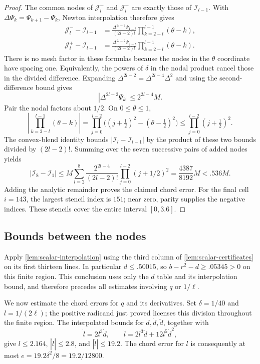 \begin{proof}
The common nodes of $\mathcal{J}_l^-$ and $\mathcal{J}_l^+$ are exactly those of $\mathcal{I}_{l-1}$. With $\Delta\Psi_k=\Psi_{k+1}-\Psi_k$, Newton interpolation therefore gives
\[
\begin{aligned}
 \mathcal{J}_l^--\mathcal{I}_{l-1}
  &=\frac{\Delta^{2l-2}\Psi_{1-l}}{(2l-2)!}
       \prod_{k=2-l}^{l-1}(\theta-k),\\
 \mathcal{J}_l^+-\mathcal{I}_{l-1}
  &=\frac{\Delta^{2l-2}\Psi_{2-l}}{(2l-2)!}
       \prod_{k=2-l}^{l-1}(\theta-k).
\end{aligned}
\]
There is no mesh factor in these formulas because the nodes in the $\theta$ coordinate have spacing one. Equivalently, the powers of $\delta$ in the nodal product cancel those in the divided difference. Expanding $\Delta^{2l-2}=\Delta^{2l-4}\Delta^2$ and using the second-difference bound gives
\[
 |\Delta^{2l-2}\Psi_k|\le 2^{2l-4}M.
\]
Pair the nodal factors about $1/2$. On $0\le\theta\le1$,
\[
 \left|\prod_{k=2-l}^{l-1}(\theta-k)\right|
 =\prod_{j=0}^{l-2}\big((j+\tfrac12)^2-(\theta-\tfrac12)^2\big)
 \le\prod_{j=0}^{l-2}(j+\tfrac12)^2.
\]
The convex-blend identity bounds $|\mathcal{I}_l-\mathcal{I}_{l-1}|$ by the product of these two bounds divided by $(2l-2)!$. Summing over the seven successive pairs of added nodes yields
\[
 |\mathcal{I}_8-\mathcal{I}_1|
 \le M\sum_{l=2}^8
      \frac{2^{2l-4}}{(2l-2)!}\prod_{j=0}^{l-2}(j+1/2)^2
 =\frac{4387}{8192}M<.536M.
\]
Adding the analytic remainder proves the claimed chord error. For the final cell $i=143$, the largest stencil index is $151$; near zero, parity supplies the negative indices. These stencils cover the entire interval $[0,3.6]$.
\end{proof}

\subsection{Bounds between the nodes}

Apply \cref{lem:scalar-interpolation} using the third column of \cref{lem:scalar-certificates} on its first thirteen lines. In particular $d\le.50015$, so $b-r^2-d\ge.05345>0$ on this finite region. This conclusion uses only the $d$ table and its interpolation bound, and therefore precedes all estimates involving $q$ or $1/\ell$.

We now estimate the chord errors for $q$ and its derivatives. Set $\delta=1/40$ and $l=1/(2\ell)$; the positive radicand just proved licenses this division throughout the finite region. The interpolated bounds for $d,\dot d,\ddot d$, together with
\[
 \dot l=2l^3\dot d,\qquad
 \ddot l=2l^3\ddot d+12l^5\dot d^2,
\]
give $l\le2.164$, $|\dot l|\le2.8$, and $|\ddot l|\le19.2$. The chord error for $l$ is consequently at most $e=19.2\delta^2/8=19.2/12800$.

